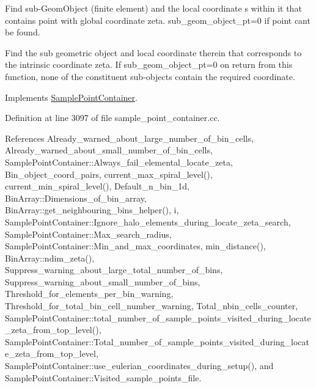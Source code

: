 Find sub-\/\+Geom\+Object (finite element) and the local coordinate s within it that contains point with global coordinate zeta. sub\+\_\+geom\+\_\+object\+\_\+pt=0 if point can\textquotesingle{}t be found. 

Find the sub geometric object and local coordinate therein that corresponds to the intrinsic coordinate zeta. If sub\+\_\+geom\+\_\+object\+\_\+pt=0 on return from this function, none of the constituent sub-\/objects contain the required coordinate. 

Implements \hyperlink{classSamplePointContainer_acca8dbae8346d6c8924b1f815aa5f049}{Sample\+Point\+Container}.



Definition at line 3097 of file sample\+\_\+point\+\_\+container.\+cc.



References Already\+\_\+warned\+\_\+about\+\_\+large\+\_\+number\+\_\+of\+\_\+bin\+\_\+cells, Already\+\_\+warned\+\_\+about\+\_\+small\+\_\+number\+\_\+of\+\_\+bin\+\_\+cells, Sample\+Point\+Container\+::\+Always\+\_\+fail\+\_\+elemental\+\_\+locate\+\_\+zeta, Bin\+\_\+object\+\_\+coord\+\_\+pairs, current\+\_\+max\+\_\+spiral\+\_\+level(), current\+\_\+min\+\_\+spiral\+\_\+level(), Default\+\_\+n\+\_\+bin\+\_\+1d, Bin\+Array\+::\+Dimensions\+\_\+of\+\_\+bin\+\_\+array, Bin\+Array\+::get\+\_\+neighbouring\+\_\+bins\+\_\+helper(), i, Sample\+Point\+Container\+::\+Ignore\+\_\+halo\+\_\+elements\+\_\+during\+\_\+locate\+\_\+zeta\+\_\+search, Sample\+Point\+Container\+::\+Max\+\_\+search\+\_\+radius, Sample\+Point\+Container\+::\+Min\+\_\+and\+\_\+max\+\_\+coordinates, min\+\_\+distance(), Bin\+Array\+::ndim\+\_\+zeta(), Suppress\+\_\+warning\+\_\+about\+\_\+large\+\_\+total\+\_\+number\+\_\+of\+\_\+bins, Suppress\+\_\+warning\+\_\+about\+\_\+small\+\_\+number\+\_\+of\+\_\+bins, Threshold\+\_\+for\+\_\+elements\+\_\+per\+\_\+bin\+\_\+warning, Threshold\+\_\+for\+\_\+total\+\_\+bin\+\_\+cell\+\_\+number\+\_\+warning, Total\+\_\+nbin\+\_\+cells\+\_\+counter, Sample\+Point\+Container\+::total\+\_\+number\+\_\+of\+\_\+sample\+\_\+points\+\_\+visited\+\_\+during\+\_\+locate\+\_\+zeta\+\_\+from\+\_\+top\+\_\+level(), Sample\+Point\+Container\+::\+Total\+\_\+number\+\_\+of\+\_\+sample\+\_\+points\+\_\+visited\+\_\+during\+\_\+locate\+\_\+zeta\+\_\+from\+\_\+top\+\_\+level, Sample\+Point\+Container\+::use\+\_\+eulerian\+\_\+coordinates\+\_\+during\+\_\+setup(), and Sample\+Point\+Container\+::\+Visited\+\_\+sample\+\_\+points\+\_\+file.

\mbox{\label{classNonRefineableBinArray_ac10de308f4d85c5f28d35d598ec51e32}} 
